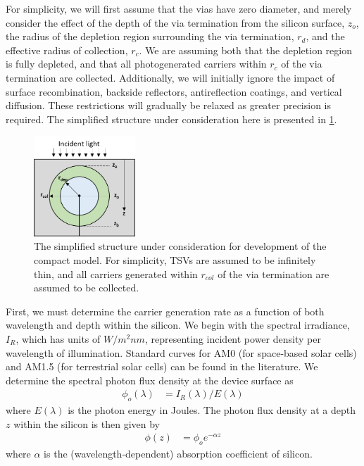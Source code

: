 \documentclass[journal,twoside]{IEEEtran}
\begin{document}
For simplicity, we will first assume that the vias have zero diameter, and merely consider the effect of the
depth of the via termination from the silicon surface, $z_o$, the radius of the depletion region surrounding
the via termination, $r_d$, and the effective radius of collection, $r_c$. We are assuming both that the depletion
region is fully depleted, and that all photogenerated carriers within $r_c$ of the via termination are collected.
Additionally, we will initially ignore the impact of surface recombination, backside reflectors, antireflection coatings,
and vertical diffusion. These restrictions will gradually be relaxed as greater precision is required.
The simplified structure under consideration here is presented in \cref{f-via-collector-structure-simplified}.

\begin{figure}[tb]
	\centering
	\includegraphics[width=1.5in]{figures/geometry_ideal.png}
	\caption{	The simplified structure under consideration for development of the compact model.
				For simplicity, TSVs are assumed to be infinitely thin, and all carriers generated within
				$r_{col}$ of the via termination are assumed to be collected.}
	\label{f-via-collector-structure-simplified}
\end{figure}
	

First, we must determine the carrier generation rate as a function of both wavelength and depth within the silicon.
We begin with the spectral irradiance, $I_R$, which has units of $W/m^2nm$, representing incident power density per
wavelength of illumination. Standard curves for AM0 (for space-based solar cells) and AM1.5 (for terrestrial solar cells)
can be found in the literature. We determine the spectral photon flux density at the device surface as
\begin{align}
	\phi_o(\lambda) &= I_R(\lambda)/E(\lambda)	\label{eq-spectral-flux-density}
\end{align}
where $E(\lambda)$ is the photon energy in Joules. The photon flux density at a depth $z$ within the silicon
is then given by
\begin{align}
	\phi(z) &= \phi_o e^{-\alpha z}	\label{eq-flux-density-depth}
\end{align}
where $\alpha$ is the (wavelength-dependent) absorption coefficient of silicon.
\end{document}
